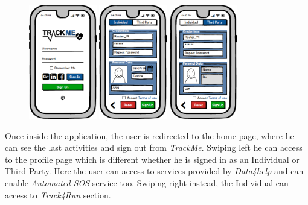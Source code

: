 \documentclass[a4paper]{article}
\begin{document}
\begin{figure}[!htpb]
    	\centering
    	\includegraphics[height=50mm]{images/mockups/Login_Registration.png}
    	\includegraphics[height=50mm]{images/mockups/RegistrationForm.png}
    	\includegraphics[height=50mm]{images/mockups/ThirdPartyRegistration.png}
        \end{figure}

Once inside the application, the user is redirected to the home page, where he can see the last activities and sign out from \textit{TrackMe}. Swiping left he can access to the profile page which is different whether he is signed in as an Individual or Third-Party. Here the user can access to services provided by \textit{Data4help} and can enable \textit{Automated-SOS} service too. Swiping right instead, the Individual can access to \textit{Track4Run} section.
\end{document}
